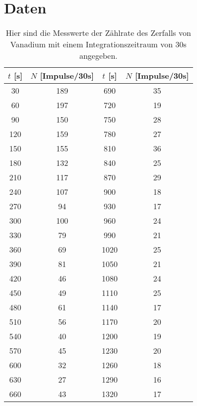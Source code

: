 \newpage
\section{Daten}
    \begin{table}[h]
        \centering
        \caption{Hier sind die Messwerte der Zählrate des Zerfalls von Vanadium mit einem Integrationszeitraum von 30s angegeben.}
        \label{tab:Vanadium}
        \begin{tabular}{c c c c}
        \toprule
        {$t$ [s]} & {$N$ [Impulse/30s]} & {$t$ [s]} & {$N$ [Impulse/30s]} \\
        \midrule
        30	 &  189  &  690   &  35 \\
        60	 &  197  &  720   &  19 \\
        90	 &  150  &  750   &  28 \\
        120	 &  159  &  780   &  27 \\
        150	 &  155  &  810   &  36 \\
        180	 &  132  &  840   &  25 \\
        210	 &  117  &  870   &  29 \\
        240	 &  107  &  900   &  18 \\
        270	 &  94   &  930   &  17 \\
        300	 &  100  &  960   &  24 \\
        330	 &  79   &  990   &  21 \\
        360	 &  69   &  1020  &  25 \\
        390	 &  81   &  1050  &  21 \\
        420	 &  46   &  1080  &  24 \\
        450	 &  49   &  1110  &  25 \\
        480	 &  61   &  1140  &  17 \\
        510	 &  56   &  1170  &  20 \\
        540	 &  40   &  1200  &  19 \\
        570	 &  45   &  1230  &  20 \\
        600	 &  32   &  1260  &  18 \\
        630	 &  27   &  1290  &  16 \\
        660	 &  43   &  1320  &  17 \\                        
        \bottomrule
        \end{tabular}
    \end{table}

    \FloatBarrier

